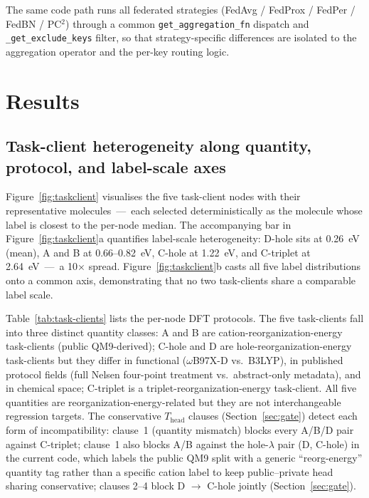 \documentclass[11pt,a4paper]{article}
\begin{document}
The same code path runs all federated strategies (FedAvg / FedProx / FedPer / FedBN / PC$^2$) through a common \verb|get_aggregation_fn| dispatch and \verb|_get_exclude_keys| filter, so that strategy-specific differences are isolated to the aggregation operator and the per-key routing logic.

\section{Results}\label{sec:results}

\subsection{Task-client heterogeneity along quantity, protocol, and label-scale axes}\label{sec:heterogeneity}

Figure~\ref{fig:taskclient} visualises the five task-client nodes with their representative molecules~---~each selected deterministically as the molecule whose label is closest to the per-node median. The accompanying bar in Figure~\ref{fig:taskclient}a quantifies label-scale heterogeneity: D-hole sits at \SI{0.26}{\eV} (mean), A and B at \SI{0.66}{}--\SI{0.82}{\eV}, C-hole at \SI{1.22}{\eV}, and C-triplet at \SI{2.64}{\eV}~---~a 10$\times$ spread. Figure~\ref{fig:taskclient}b casts all five label distributions onto a common axis, demonstrating that no two task-clients share a comparable label scale.

Table~\ref{tab:task-clients} lists the per-node DFT protocols. The five task-clients fall into three distinct quantity classes: A and B are cation-reorganization-energy task-clients (public QM9-derived); C-hole and D are hole-reorganization-energy task-clients but they differ in functional ($\omega$B97X-D vs.\ B3LYP), in published protocol fields (full Nelsen four-point treatment vs.\ abstract-only metadata), and in chemical space; C-triplet is a triplet-reorganization-energy task-client. All five quantities are reorganization-energy-related but they are not interchangeable regression targets. The conservative $T_{\mathrm{head}}$ clauses (Section~\ref{sec:gate}) detect each form of incompatibility: clause~1 (quantity mismatch) blocks every A/B/D pair against C-triplet; clause~1 also blocks A/B against the hole-$\lambda$ pair (D, C-hole) in the current code, which labels the public QM9 split with a generic ``reorg-energy'' quantity tag rather than a specific cation label to keep public--private head sharing conservative; clauses 2--4 block D $\to$ C-hole jointly (Section~\ref{sec:gate}).
\end{document}
